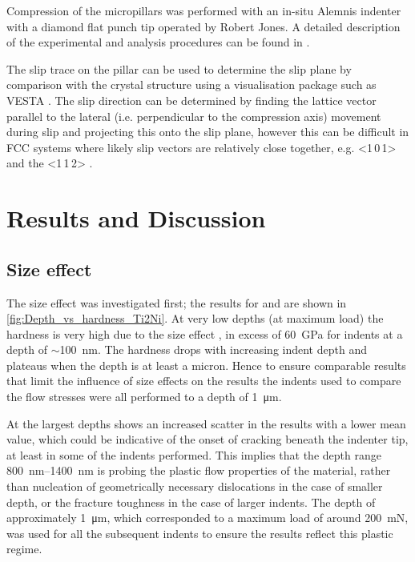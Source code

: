 Compression of the micropillars was performed with an in-situ Alemnis indenter with a diamond flat punch tip operated by Robert Jones. A detailed description of the experimental and analysis procedures can be found in \cite{Davis2015}.

The slip trace on the pillar can be used to determine the slip plane by comparison with the crystal structure using a visualisation package such as VESTA \cite{Momma2011,Davis2015}. The slip direction can be determined by finding the lattice vector parallel to the lateral (i.e. perpendicular to the compression axis) movement during slip and projecting this onto the slip plane, however this can be difficult in FCC systems where likely slip vectors are relatively close together, e.g. <1\,0\,1> and the <1\,1\,2> \cite{Davis2015}.


\section{Results and Discussion}


\subsection{Size effect}


The size effect was investigated first; the results for  and  are shown in \autoref{fig:Depth_vs_hardness_Ti2Ni}. At very low depths (at maximum load) the hardness is very high due to the size effect \cite{Cripps2011}, in excess of \SI{60}{\giga\pascal} for indents at a depth of $\sim$\SI{100}{\nano\meter}. The hardness drops with increasing indent depth and plateaus when the depth is at least a micron. Hence to ensure comparable results that limit the influence of size effects on the results the indents used to compare the flow stresses were all performed to a depth of \SI{1}{\micro\meter}. 

At the largest depths  shows an increased scatter in the results with a lower mean value, which could be indicative of the onset of cracking beneath the indenter tip, at least in some of the indents performed. This implies that the depth range \SIrange{800}{1400}{\nano\meter} is probing the plastic flow properties of the material, rather than nucleation of geometrically necessary dislocations in the case of smaller depth, or the fracture toughness in the case of larger indents. The depth of approximately \SI{1}{\micro\meter}, which corresponded to a maximum load of around \SI{200}{\milli\newton}, was used for all the subsequent indents to ensure the results reflect this plastic regime.


